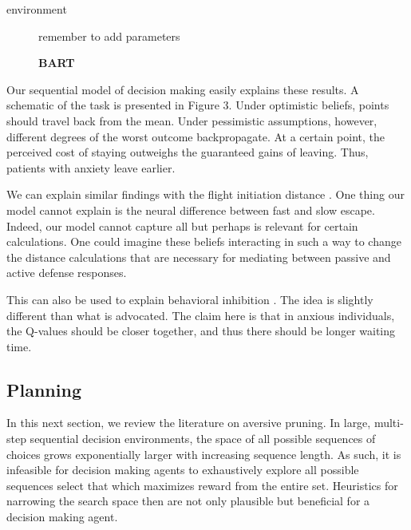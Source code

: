 environment\documentclass[11pt]{article} %
\begin{document}
\begin{figure}
  \centerline{%
  }
  \caption{\textbf{BART}}
  \par remember to add parameters
\end{figure}

Our sequential model of decision making easily explains these results. A schematic
of the task is presented in Figure 3. Under optimistic beliefs, points should
travel back from the mean. Under pessimistic assumptions, however, different
degrees of the worst outcome backpropagate. At a certain point, the perceived cost
of staying outweighs the guaranteed gains of leaving. Thus, patients with anxiety
leave earlier.

We can explain similar findings with the flight initiation distance \citep{Mobbs2018,
Mobbs2019}. One thing our model cannot explain is the neural difference between
fast and slow escape. Indeed, our model cannot capture all but perhaps is relevant
for certain calculations. One could imagine these beliefs interacting in such a
way to change the distance calculations that are necessary for mediating between
passive and active defense responses.

This can also be used to explain behavioral inhibition \citep{bach2015, khemka2017}.
The idea is slightly different than what is advocated. The claim here is that
in anxious individuals, the Q-values should be closer together, and thus there
should be longer waiting time.

\subsection{Planning}

In this next section, we review the literature on aversive pruning. In large,
multi-step sequential decision environments, the space of all possible sequences
of choices grows exponentially larger with increasing sequence length. As such,
it is infeasible for decision making agents to exhaustively explore all possible
sequences select that which maximizes reward from the entire set. Heuristics for
narrowing the search space then are not only plausible but beneficial for a
decision making agent.
\end{document}
